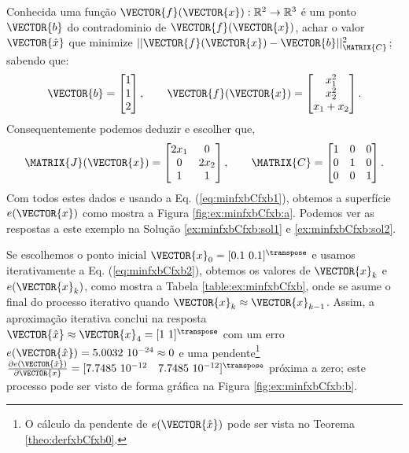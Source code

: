 \begin{example}
\label{ex:minfxbCfxb}
Conhecida uma função $\VECTOR{f}(\VECTOR{x}) : \mathbb{R}^{2} \rightarrow \mathbb{R}^{3}$
é um ponto $\VECTOR{b}$ do contradominio de $\VECTOR{f}(\VECTOR{x})$,
achar o valor $\VECTOR{\hat{x}}$ que minimize $||\VECTOR{f}(\VECTOR{x})-\VECTOR{b}||_{\MATRIX{C}}^2$;
sabendo que:
\begin{equation}
\VECTOR{b}=\begin{bmatrix}
1\\
1\\
2
\end{bmatrix},
\qquad 
\VECTOR{f}(\VECTOR{x})=\begin{bmatrix}
x_1^2\\
x_2^2\\
x_1+x_2
\end{bmatrix}.
\end{equation}
Consequentemente podemos deduzir e escolher que, 
\begin{equation}\label{eq:lab:ex2fx}
\MATRIX{J}(\VECTOR{x})=\begin{bmatrix}
2 x_1 & 0\\
0 & 2 x_2\\
1 & 1
\end{bmatrix},
\qquad
\MATRIX{C}=\begin{bmatrix}
1 & 0 & 0\\
0 & 1 & 0\\
0 & 0 & 1
\end{bmatrix}.
\end{equation}
Com todos estes dados e usando a Eq. (\ref{eq:minfxbCfxb1}),
obtemos a superfície $e(\VECTOR{x})$ como mostra a Figura \ref{fig:ex:minfxbCfxb:a}.
Podemos ver as respostas a este exemplo na Solução \ref{ex:minfxbCfxb:sol1} e \ref{ex:minfxbCfxb:sol2}.
\end{example}

\begin{SolutionT}
\label{ex:minfxbCfxb:sol1}
Se escolhemos o ponto inicial $\VECTOR{x}_0=[0.1~0.1]^{\transpose}$ e 
usamos iterativamente a Eq. (\ref{eq:minfxbCfxb2}), obtemos os valores 
de $\VECTOR{x}_k$ e $e(\VECTOR{x}_k)$, como mostra a Tabela \ref{table:ex:minfxbCfxb},
onde se asume o final do processo iterativo quando $\VECTOR{x}_k \approx \VECTOR{x}_{k-1}$.
Assim, a aproximação iterativa conclui na resposta $\VECTOR{\hat{x}}\approx \VECTOR{x}_{4} =[1~1]^{\transpose}$
com um erro $e(\VECTOR{\hat{x}})=5.0032~10^{-24}\approx 0$ e uma pendente\footnote{\label{ref:pendenteex} O
cálculo da pendente de $e(\VECTOR{\hat{x}})$ pode ser vista no Teorema \ref{theo:derfxbCfxb0}.}
$\frac{\partial e(\VECTOR{\hat{x}})}{\partial \VECTOR{x} }=[7.7485~10^{-12}\quad 7.7485~10^{-12}]^{\transpose}$
próxima a zero;
este processo pode ser visto de forma gráfica na Figura \ref{fig:ex:minfxbCfxb:b}.
\end{SolutionT}



